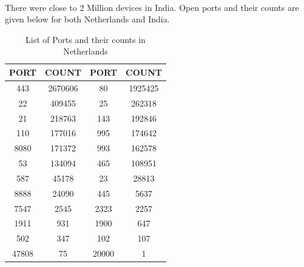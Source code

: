 \documentclass{report}
\begin{document}
\paragraph{}
There were close to 2 Million devices in India. Open ports and their counts are given below for both Netherlands and India.


\begin{table}[h!]
\begin{center}
\begin{tabular}{ |c|c|||||c|c| } 
 \hline
 \textbf{PORT} & \textbf{COUNT} & \textbf{PORT} & \textbf{COUNT}\\
 \hline
 443 & 2670606  & 80 & 1925425\\
  \hline

22 & 409455  & 25 & 262318\\
  \hline
 
 21 & 218763 & 143 & 192846   \\
  \hline

 110 & 177016 & 995	 & 174642 \\
  \hline
 
 8080 & 171372 &  993 & 162578 \\
  \hline
 
 53 & 134094 & 465 & 108951 \\
 \hline
 
 587 & 45178 & 23	 & 28813 \\
 \hline

 8888 & 24090  & 445	 & 5637\\
 \hline

 7547 & 2545  & 2323 & 2257 \\
 \hline
 
 1911 & 931  & 1900 & 647 \\
 \hline
 
 502 & 347  & 102 & 107 \\
 \hline
 
 47808 & 75  & 20000 & 1 \\
 \hline

\end{tabular}
\caption{List of Ports and their counts in Netherlands}
\end{center}
\end{table}
\end{document}
